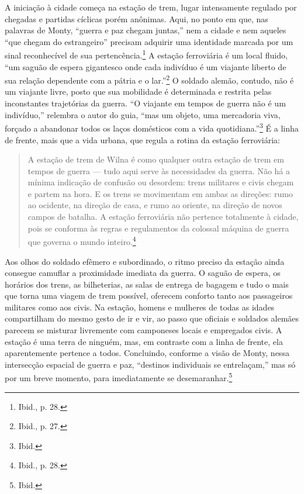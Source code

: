 \asterisc

A iniciação à cidade começa na estação de trem, lugar intensamente
regulado por chegadas e partidas cíclicas porém anônimas. Aqui, no ponto
em que, nas palavras de Monty, ``guerra e paz chegam juntas,'' nem a
cidade e nem aqueles ``que chegam do estrangeiro'' precisam adquirir uma
identidade marcada por um sinal reconhecível de sua
pertencência.\footnote{Ibid., p. 28.} A estação ferroviária é um local
fluido, ``um saguão de espera gigantesco onde cada indivíduo é um
viajante liberto de sua relação dependente com a pátria e o
lar.''\footnote{Ibid., p. 27.} O soldado alemão, contudo, não é um
viajante livre, posto que sua mobilidade é determinada e restrita pelas
inconstantes trajetórias da guerra. ``O viajante em tempos de guerra não
é um indivíduo,'' relembra o autor do guia, ``mas um objeto, uma
mercadoria viva, forçado a abandonar todos os laços domésticos com a
vida quotidiana.''\footnote{Ibid.} É a linha de frente, mais que a vida
urbana, que regula a rotina da estação ferroviária:

%

\begin{quote}
A estação de trem de Wilna é como qualquer outra estação de trem em
tempos de guerra --- tudo aqui serve às necessidades da guerra. Não há a
mínima indicação de confusão ou desordem: trens militares e civis chegam
e partem na hora. E os trens se movimentam em ambas as direções: rumo ao
ocidente, na direção de casa, e rumo ao oriente, na direção de novos
campos de batalha. A estação ferroviária não pertence totalmente à
cidade, pois se conforma às regras e regulamentos da colossal máquina de
guerra que governa o mundo inteiro.\footnote{Ibid., p. 28.}
\end{quote}

Aos olhos do soldado efêmero e subordinado, o ritmo preciso da estação
ainda consegue camuflar a proximidade imediata da guerra. O saguão de
espera, os horários dos trens, as bilheterias, as salas de entrega de
bagagem e tudo o mais que torna uma viagem de trem possível, oferecem
conforto tanto aos passageiros militares como aos civis. Na estação,
homens e mulheres de todas as idades compartilham do mesmo gesto de ir e
vir, ao passo que oficiais e soldados alemães parecem se misturar
livremente com camponeses locais e empregados civis. A estação é uma
terra de ninguém, mas, em contraste com a linha de frente, ela
aparentemente pertence a todos. Concluindo, conforme a visão de Monty,
nessa intersecção espacial de guerra e paz, ``destinos individuais se
entrelaçam,'' mas só por um breve momento, para imediatamente se
desemaranhar.\footnote{Ibid.}

